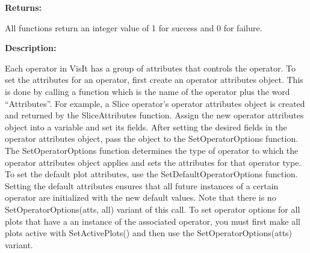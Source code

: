 \documentclass[letterpaper,10pt,english]{sphinxmanual}
\begin{document}
\begin{DUlineblock}{0em}
\item[] 
\item[] \textbf{Returns:}
\item[] All functions return an integer value of 1 for success and 0 for failure.
\item[] 
\item[] \textbf{Description:}
\item[] Each operator in VisIt has a group of attributes that controls the
operator. To set the attributes for an operator, first create an operator
attributes object. This is done by calling a function which is the name of
the operator plus the word ``Attributes''. For example, a Slice operator's
operator attributes object is created and returned by the SliceAttributes
function. Assign the new operator attributes object into a variable and set
its fields. After setting the desired fields in the operator attributes
object, pass the object to the SetOperatorOptions function. The
SetOperatorOptions function determines the type of operator to which the
operator attributes object applies and sets the attributes for that
operator type. To set the default plot attributes, use the
SetDefaultOperatorOptions function. Setting the default attributes ensures
that all future instances of a certain operator are initialized with the
new default values. Note that there is no SetOperatorOptions(atts, all)
variant of this call. To set operator options for all plots that have a
an instance of the associated operator, you must first make all plots
active with SetActivePlots() and then use the SetOperatorOptions(atts)
variant.
\end{DUlineblock}

\begin{DUlineblock}{0em}
\item[] 
\end{DUlineblock}
\end{document}

